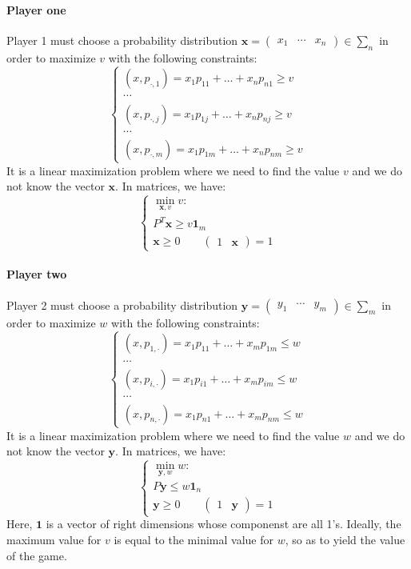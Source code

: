 \paragraph*{Player one}
Player 1 must choose a probability distribution $\mathbf{x}=\begin{pmatrix} x_1 & \cdots & x_n \end{pmatrix} \in \sum_n$ in order to maximize $v$ with the following constraints: 
\[\begin{cases}
    (x,p_{\cdot,1})=x_1p_{11}+\dots+x_np_{n1}\geq v \\
    \cdots \\
    (x,p_{\cdot,j})=x_1p_{1j}+\dots+x_np_{nj}\geq v \\
    \cdots \\
    (x,p_{\cdot,m})=x_1p_{1m}+\dots+x_np_{nm}\geq v
\end{cases}\]
It is a linear maximization problem where we need to find the value $v$ and we do not know the vector $\mathbf{x}$.
In matrices, we have: 
\[\begin{cases}
    \min_{\mathbf{x},v}v: \\
    P^T\mathbf{x} \geq v\mathbf{1}_{m} \\
    \mathbf{x}\geq 0 \qquad \begin{pmatrix} 1 & \mathbf{x} \end{pmatrix} = 1
\end{cases}\]

\paragraph*{Player two}
Player 2 must choose a probability distribution $\mathbf{y}=\begin{pmatrix} y_1 & \cdots & y_m \end{pmatrix} \in \sum_m$ in order to maximize $w$ with the following constraints: 
\[\begin{cases}
    (x,p_{1,\cdot})=x_1p_{11}+\dots+x_mp_{1m}\leq w \\
    \cdots \\
    (x,p_{i,\cdot})=x_1p_{i1}+\dots+x_mp_{im}\leq w \\
    \cdots \\
    (x,p_{n,\cdot})=x_1p_{n1}+\dots+x_mp_{nm}\leq w 
\end{cases}\]
It is a linear maximization problem where we need to find the value $w$ and we do not know the vector $\mathbf{y}$.
In matrices, we have: 
\[\begin{cases}
    \min_{\mathbf{y},w}w: \\
    P\mathbf{y} \leq w\mathbf{1}_{n} \\
    \mathbf{y}\geq 0 \qquad \begin{pmatrix} 1 & \mathbf{y} \end{pmatrix} = 1
\end{cases}\]
Here, $\mathbf{1}$ is a vector of right dimensions whose componenst are all 1's.
Ideally, the maximum value for $v$ is equal to the minimal value for $w$, so as to yield the value of the game.
